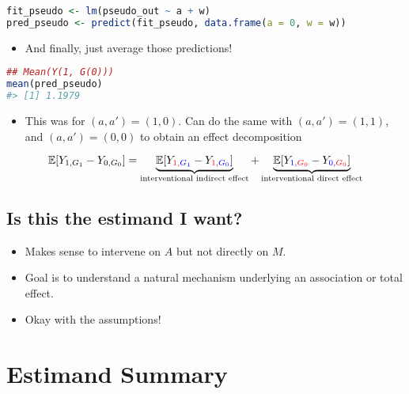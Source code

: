 \documentclass[
  12pt,
]{book}
\providecommand{\tightlist}{%
  \setlength{\itemsep}{0pt}\setlength{\parskip}{0pt}}
\theoremstyle{definition}
\theoremstyle{definition}
\theoremstyle{definition}
\newcommand{\E}{\mathbb{E}}
\newcommand{\1}{\mathbbm{1}}
\begin{document}
\begin{lstlisting}[language=R]
fit_pseudo <- lm(pseudo_out ~ a + w)
pred_pseudo <- predict(fit_pseudo, data.frame(a = 0, w = w))
\end{lstlisting}

\begin{itemize}
\tightlist
\item
  And finally, just average those predictions!
\end{itemize}

\begin{lstlisting}[language=R]
## Mean(Y(1, G(0)))
mean(pred_pseudo)
#> [1] 1.1979
\end{lstlisting}

\begin{itemize}
\tightlist
\item
  This was for \((a,a')=(1,0)\). Can do the same with \((a,a')=(1,1)\), and
  \((a,a')=(0,0)\) to obtain an effect decomposition
\end{itemize}

\begin{equation*}
  \E[Y_{1,G_1} - Y_{0,G_0}] = \underbrace{\E[Y_{\color{red}{1},
    \color{blue}{G_1}} -
    Y_{\color{red}{1},
    \color{blue}{G_0}}]}_{\text{interventional indirect effect}} +
    \underbrace{\E[Y_{\color{blue}{1},\color{red}{G_0}} -
    Y_{\color{blue}{0},
    \color{red}{G_0}}]}_{\text{interventional direct effect}}
\end{equation*}

\hypertarget{is-this-the-estimand-i-want-2}{%
\subsection{Is this the estimand I want?}\label{is-this-the-estimand-i-want-2}}

\begin{itemize}
\tightlist
\item
  Makes sense to intervene on \(A\) but not directly on \(M\).
\item
  Goal is to understand a natural mechanism underlying an association or total
  effect.
\item
  Okay with the assumptions!
\end{itemize}

\hypertarget{estimand-summary}{%
\section{Estimand Summary}\label{estimand-summary}}
\end{document}
